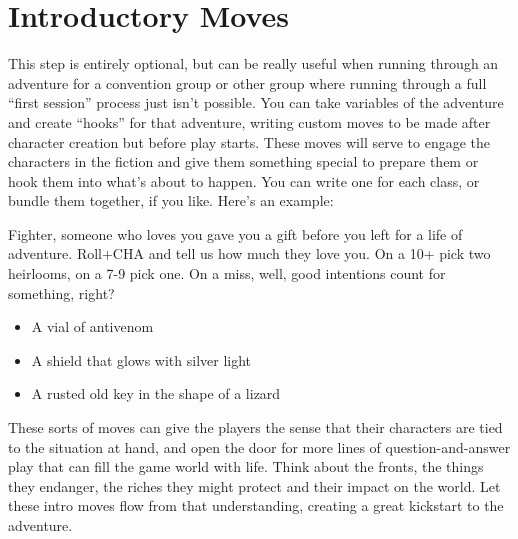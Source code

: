 \section{Introductory Moves}


 This step is entirely optional, but can be really useful when running through an adventure for a convention group or other group where running through a full ``first session'' process just isn't possible. You can take variables of the adventure and create ``hooks'' for that adventure, writing custom moves to be made after character creation but before play starts. These moves will serve to engage the characters in the fiction and give them something special to prepare them or hook them into what's about to happen. You can write one for each class, or bundle them together, if you like. Here's an example:


 Fighter, someone who loves you gave you a gift before you left for a life of adventure. Roll+CHA and tell us how much they love you. On a 10+ pick two heirlooms, on a 7-9 pick one. On a miss, well, good intentions count for something, right?
\begin{itemize}
\item A vial of antivenom
\item A shield that glows with silver light
\item A rusted old key in the shape of a lizard

\end{itemize}


 These sorts of moves can give the players the sense that their characters are tied to the situation at hand, and open the door for more lines of question-and-answer play that can fill the game world with life. Think about the fronts, the things they endanger, the riches they might protect and their impact on the world. Let these intro moves flow from that understanding, creating a great kickstart to the adventure.


